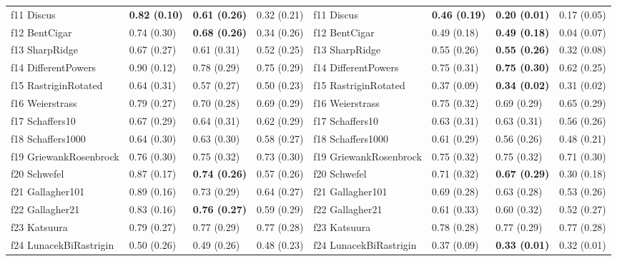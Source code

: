 \begin{table}
\begin{tabular}{llllllll}
f11 Discus & \textbf{0.82 (0.10)} & \textbf{0.61 (0.26)} & 0.32 (0.21) & f11 Discus & \textbf{0.46 (0.19)} & \textbf{0.20 (0.01)} & 0.17 (0.05) \\
f12 BentCigar & 0.74 (0.30) & \textbf{0.68 (0.26)} & 0.34 (0.26) & f12 BentCigar & 0.49 (0.18) & \textbf{0.49 (0.18)} & 0.04 (0.07) \\
f13 SharpRidge & 0.67 (0.27) & 0.61 (0.31) & 0.52 (0.25) & f13 SharpRidge & 0.55 (0.26) & \textbf{0.55 (0.26)} & 0.32 (0.08) \\
f14 DifferentPowers & 0.90 (0.12) & 0.78 (0.29) & 0.75 (0.29) & f14 DifferentPowers & 0.75 (0.31) & \textbf{0.75 (0.30)} & 0.62 (0.25) \\
f15 RastriginRotated & 0.64 (0.31) & 0.57 (0.27) & 0.50 (0.23) & f15 RastriginRotated & 0.37 (0.09) & \textbf{0.34 (0.02)} & 0.31 (0.02) \\
f16 Weierstrass & 0.79 (0.27) & 0.70 (0.28) & 0.69 (0.29) & f16 Weierstrass & 0.75 (0.32) & 0.69 (0.29) & 0.65 (0.29) \\
f17 Schaffers10 & 0.67 (0.29) & 0.64 (0.31) & 0.62 (0.29) & f17 Schaffers10 & 0.63 (0.31) & 0.63 (0.31) & 0.56 (0.26) \\
f18 Schaffers1000 & 0.64 (0.30) & 0.63 (0.30) & 0.58 (0.27) & f18 Schaffers1000 & 0.61 (0.29) & 0.56 (0.26) & 0.48 (0.21) \\
f19 GriewankRosenbrock & 0.76 (0.30) & 0.75 (0.32) & 0.73 (0.30) & f19 GriewankRosenbrock & 0.75 (0.32) & 0.75 (0.32) & 0.71 (0.30) \\
f20 Schwefel & 0.87 (0.17) & \textbf{0.74 (0.26)} & 0.57 (0.26) & f20 Schwefel & 0.71 (0.32) & \textbf{0.67 (0.29)} & 0.30 (0.18) \\
f21 Gallagher101 & 0.89 (0.16) & 0.73 (0.29) & 0.64 (0.27) & f21 Gallagher101 & 0.69 (0.28) & 0.63 (0.28) & 0.53 (0.26) \\
f22 Gallagher21 & 0.83 (0.16) & \textbf{0.76 (0.27)} & 0.59 (0.29) & f22 Gallagher21 & 0.61 (0.33) & 0.60 (0.32) & 0.52 (0.27) \\
f23 Katsuura & 0.79 (0.27) & 0.77 (0.29) & 0.77 (0.28) & f23 Katsuura & 0.78 (0.28) & 0.77 (0.29) & 0.77 (0.28) \\
f24 LunacekBiRastrigin & 0.50 (0.26) & 0.49 (0.26) & 0.48 (0.23) & f24 LunacekBiRastrigin & 0.37 (0.09) & \textbf{0.33 (0.01)} & 0.32 (0.01) \\
\bottomrule
\end{tabular}
\end{table}
